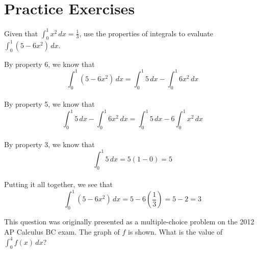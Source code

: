 \section{Practice Exercises}
\begin{Exercise}[label=defint2]
Given that $\int_{0}^{1} x^2\,dx = \frac{1}{3}$, use the properties 
of integrals to evaluate $\int_{0}^{1} (5-6x^2)\,dx$. 
\end{Exercise}

\begin{Answer}[ref=defint2]
By property 6, we know that $$\int_{0}^{1} (5-6x^2)\,dx = \int_{0}^{1} 
5\,dx - \int_{0}^{1} 6x^2\,dx$$\\
By property 5, we know that $$\int_{0}^{1} 5\,dx - \int_{0}^{1} 6x^2\,
dx = \int_{0}^{1} 5\,dx - 6\int_{0}^{1} x^2\,dx$$\\
By property 3, we know that $$\int_{0}^{1} 5\,dx = 5(1 - 0) = 5$$\\
Putting it all together, we see that $$\int_{0}^{1} (5-6x^2)\,dx = 5 
- 6(\frac{1}{3}) = 5 - 2 = 3$$
\end{Answer}

\begin{Exercise}[label=defint3]
	This question was originally presented as a multiple-choice problem 
	on the 2012 AP Calculus BC exam. The graph of $f$ is shown. What is 
	the value of $\int_{0}^{4} f(x)\,dx$?\\
\end{Exercise}

